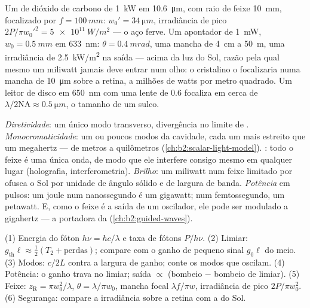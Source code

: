 \begin{example}\label{ex:b2:laser:focus}
Um  de dióxido de carbono de \qty{1}{kW} em \qty{10.6}{\micro m}, com raio de feixe
\qty{10}{mm}, focalizado por $f = \qty{100}{mm}$: $w_0' = \qty{34}{\micro m}$,
irradiância de pico $2P/\pi w_0'^2 = \qty{5e11}{W/m^2}$ --- o aço ferve.
Um apontador de \qty{1}{mW}, $w_0 = \qty{0.5}{mm}$ em \qty{633}{nm}: $\theta =
\qty{0.4}{mrad}$, uma mancha de \qty{4}{cm} a \qty{50}{m}, uma irradiância de
\qty{2.5}{kW/m^2} na saída --- acima da luz do Sol, razão pela qual mesmo um
miliwatt jamais deve entrar num olho: o cristalino o focalizaria numa
mancha de \qty{10}{\micro m} sobre a retina, a milhões de watts por metro
quadrado. Um leitor de disco em \qty{650}{nm} com uma lente de 
$0.6$ focaliza em cerca de $\lambda/2\mathrm{NA} \approx \qty{0.5}{\micro m}$,
o tamanho de um sulco.
\end{example}

\begin{remark}\label{rem:b2:laser:special}
\emph{Diretividade}: um único modo transverso, divergência no limite
de . \emph{Monocromaticidade}: um ou poucos modos da cavidade, cada um
mais estreito que um megahertz ---  de metros a quilômetros
(\cref{ch:b2:scalar-light-model}). \emph{}: todo o
feixe é uma única onda, de modo que ele interfere consigo mesmo em qualquer lugar (holografia,
interferometria). \emph{Brilho}: um miliwatt num feixe limitado por 
ofusca o Sol por unidade de ângulo sólido e de largura de banda. \emph{Potência}
em pulsos: um joule num nanossegundo é um gigawatt; num femtossegundo, um
petawatt. E, como o feixe é a saída de um oscilador, ele pode ser
modulado a gigahertz --- a portadora da 
(\cref{ch:b2:guided-waves}).
\end{remark}

\begin{method}\label{meth:b2:laser:method}
(1) Energia do fóton $h\nu = hc/\lambda$ e taxa de fótons $P/h\nu$.
(2) Limiar: $g_{\text{th}}\ell \approx \tfrac12(T_2 + \text{perdas})$;
compare com o ganho de pequeno sinal $g_0\ell$ do meio.
(3) Modos: $c/2L$ contra a largura de ganho; conte os modos que oscilam.
(4) Potência: o ganho trava no limiar; saída $\propto$ (bombeio $-$
bombeio de limiar). (5) Feixe: $z_{\text{R}} = \pi w_0^2/\lambda$, $\theta =
\lambda/\pi w_0$, mancha focal $\lambda f/\pi w$, irradiância de pico
$2P/\pi w_0^2$. (6) Segurança: compare a irradiância sobre a retina com a
do Sol.
\end{method}

